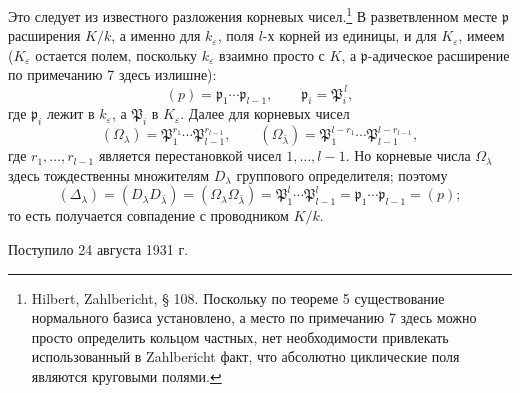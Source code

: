 \documentclass[11pt]{article}
\providecommand{\frakp}{\mathfrak{p}}
\begin{document}
Это следует из известного разложения корневых чисел.\footnote{Hilbert, Zahlbericht, § 108. Поскольку по теореме 5 существование нормального базиса установлено, а место по примечанию 7 здесь можно просто определить кольцом частных, нет необходимости привлекать использованный в Zahlbericht факт, что абсолютно циклические поля являются круговыми полями.} В разветвленном месте \(\frakp\) расширения \(K/k\), а именно для \(k_\varepsilon\), поля \(l\)-х корней из единицы, и для \(K_\varepsilon\), имеем (\(K_\varepsilon\) остается полем, поскольку \(k_\varepsilon\) взаимно просто с \(K\), а \(\frakp\)-адическое расширение по примечанию 7 здесь излишне):
\[
        (p)=\frakp_1\cdots\frakp_{l-1},
        \qquad
        \frakp_i=\mathfrak P_i^{\,l},
\]
где \(\frakp_i\) лежит в \(k_\varepsilon\), а \(\mathfrak P_i\) в \(K_\varepsilon\). Далее для корневых чисел
\[
        (\Omega_\lambda)=\mathfrak P_1^{r_1}\cdots\mathfrak P_{l-1}^{r_{l-1}},
        \qquad
        (\Omega_{\bar\lambda})=
        \mathfrak P_1^{l-r_1}\cdots \mathfrak P_{l-1}^{l-r_{l-1}},
\]
где \(r_1,\ldots,r_{l-1}\) является перестановкой чисел \(1,\ldots,l-1\). Но корневые числа \(\Omega_\lambda\) здесь тождественны множителям \(D_\lambda\) группового определителя; поэтому
\[
        (\Delta_\lambda)=(D_\lambda D_{\bar\lambda})
        =(\Omega_\lambda\Omega_{\bar\lambda})
        =\mathfrak P_1^{l}\cdots\mathfrak P_{l-1}^{l}
        =\frakp_1\cdots\frakp_{l-1}=(p);
\]
то есть получается совпадение с проводником \(K/k\).

\begin{center}
Поступило 24 августа 1931 г.
\end{center}
\end{document}
